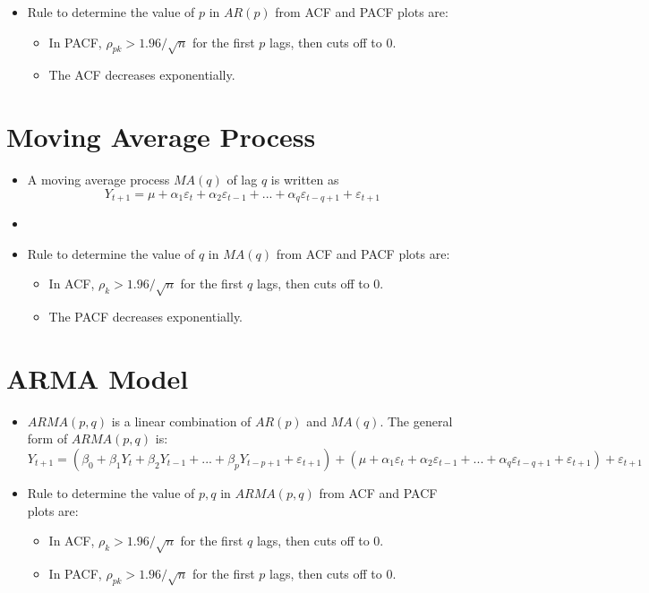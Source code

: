 \documentclass{article}
\theoremstyle{plain}
\theoremstyle{definition}
\begin{document}
\begin{itemize}
    \item Rule to determine the value of $p$ in $AR(p)$ from ACF and PACF plots are:
    \begin{itemize}
        \item In PACF, $\rho_{pk} > 1.96/\sqrt{n}$ for the first $p$ lags, then cuts off to 0.
        
        \item The ACF decreases exponentially. 
    \end{itemize}
\end{itemize}

\section{Moving Average Process}
\begin{itemize}
    \item A moving average process $MA(q)$ of lag $q$ is written as
    \begin{equation*}
        Y_{t+1} = \mu + \alpha_1 \varepsilon_t + \alpha_2 \varepsilon_{t-1} + ... + \alpha_q \varepsilon_{t-q+1} + \varepsilon_{t+1}
    \end{equation*}
    
    \item \item Rule to determine the value of $q$ in $MA(q)$ from ACF and PACF plots are:
    \begin{itemize}
        \item In ACF, $\rho_{k} > 1.96/\sqrt{n}$ for the first $q$ lags, then cuts off to 0.
        
        \item The PACF decreases exponentially. 
    \end{itemize}
\end{itemize}

\section{ARMA Model}
\begin{itemize}
    \item $ARMA(p,q)$ is a linear combination of $AR(p)$ and $MA(q)$. The general form of $ARMA(p, q)$ is:
    \begin{equation*}
        Y_{t+1} = (\beta_0 + \beta_1 Y_{t} + \beta_2 Y_{t-1} + ... + \beta_p Y_{t-p+1} + \varepsilon_{t+1}) + (\mu + \alpha_1 \varepsilon_t + \alpha_2 \varepsilon_{t-1} + ... + \alpha_q \varepsilon_{t-q+1} + \varepsilon_{t+1}) + \varepsilon_{t+1}
    \end{equation*}
    
    \item Rule to determine the value of $p, q$ in $ARMA(p, q)$ from ACF and PACF plots are:
    \begin{itemize}
        \item In ACF, $\rho_{k} > 1.96/\sqrt{n}$ for the first $q$ lags, then cuts off to 0.
        
        \item In PACF, $\rho_{pk} > 1.96/\sqrt{n}$ for the first $p$ lags, then cuts off to 0.
    \end{itemize}
\end{itemize}
\end{document}
